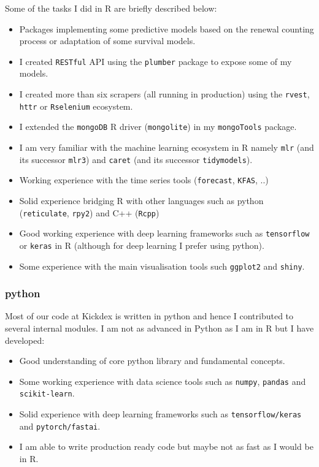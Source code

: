 \documentclass[11pt]{article}
\begin{document}
Some of the tasks I did in R are briefly described below:
\begin{itemize}
\item Packages implementing some predictive models based on the renewal counting
process or adaptation of some survival models.
\item I created \texttt{RESTful} API using the \texttt{plumber} package to expose some of my
models.
\item I created more than six scrapers (all running in production) using the
\texttt{rvest}, \texttt{httr} or \texttt{Rselenium} ecosystem.
\item I extended the \texttt{mongoDB} R driver (\texttt{mongolite}) in my \texttt{mongoTools} package.
\item I am very familiar with the machine learning ecosystem in R namely \texttt{mlr}
(and its successor \texttt{mlr3}) and \texttt{caret} (and its successor \texttt{tidymodels}).
\item Working experience with the time series tools (\texttt{forecast}, \texttt{KFAS}, ..)
\item Solid experience bridging R with other languages such as python
(\texttt{reticulate}, \texttt{rpy2}) and C++ (\texttt{Rcpp})
\item Good working experience with deep learning frameworks such as \texttt{tensorflow}
or \texttt{keras} in R (although for deep learning I prefer using python).
\item Some experience with the main visualisation tools such \texttt{ggplot2} and
\texttt{shiny}.
\end{itemize}
\subsubsection{python}
\label{sec:org8ec856f}
Most of our code at Kickdex is written in python and hence I contributed to
several internal modules. I am not as advanced in Python as I am in R but I
have developed:
\begin{itemize}
\item Good understanding of core python library and fundamental concepts.
\item Some working experience with data science tools such as \texttt{numpy}, \texttt{pandas}
and \texttt{scikit-learn}.
\item Solid experience with deep learning frameworks such as \texttt{tensorflow/keras}
and \texttt{pytorch/fastai}.
\item I am able to write production ready code but maybe not as fast as I would
be in R.
\end{itemize}
\end{document}
